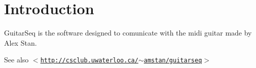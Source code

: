 \hypertarget{index_intro}{}\section{Introduction}\label{index_intro}
GuitarSeq is the software designed to comunicate with the midi guitar made by Alex Stan.

\begin{DoxySeeAlso}{See also}
$<$\href{http://csclub.uwaterloo.ca/~amstan/guitarseq}{\tt http://csclub.uwaterloo.ca/$\sim$amstan/guitarseq}$>$ 
\end{DoxySeeAlso}
